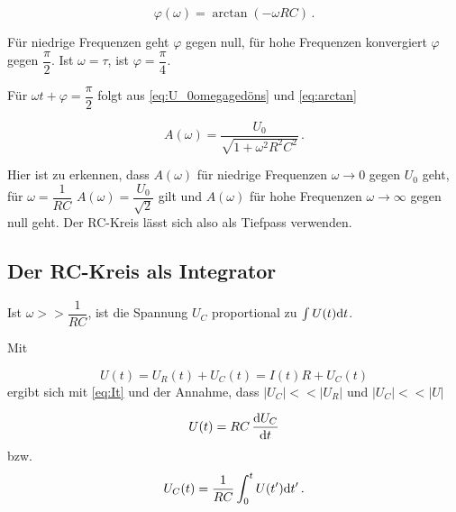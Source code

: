 \begin{equation}
    \varphi (ω) = \arctan(-ω R C) \,.
    \label{eq:arctan}
\end{equation}

Für niedrige Frequenzen geht $\varphi$ gegen null, für hohe Frequenzen konvergiert $\varphi$ gegen $\dfrac{\pi}{2}$.
Ist $\omega = \tau$, ist $\varphi = \dfrac{\pi}{4}$.

Für $\omega t + \varphi  = \dfrac{\pi}{2}$ folgt aus \eqref{eq:U_0omegagedöns} und \eqref{eq:arctan}

\begin{equation}
    A(\omega) = \frac{U_0}{\sqrt{1 + \omega^2 R^2 C^2}} \,.
\end{equation}

Hier ist zu erkennen, dass $A(\omega)$ für niedrige Frequenzen $\omega \rightarrow 0$ gegen $U_0$ geht, für $\omega = \dfrac{1}{RC}$ $A(\omega) = \dfrac{U_0}{\sqrt{2}}$ gilt und $A(\omega)$ für hohe Frequenzen $\omega \rightarrow \infty$ gegen null geht.
Der RC-Kreis lässt sich also als Tiefpass verwenden.

\subsection{Der RC-Kreis als Integrator}

Ist $\omega >> \dfrac{1}{RC}$, ist die Spannung $U_C$ proportional zu $\int U(t) \mathrm{d} t$.

Mit 

\begin{equation*}
    U(t) = U_R(t) + U_C(t) = I(t) R + U_C(t)
\end{equation*} ergibt sich mit \eqref{eq:It} und der Annahme, dass $|U_C| << |U_R|$ und $|U_C| << |U|$ 

\begin{equation}
    U(t) = RC \,\frac{\mathrm{d} U_C}{\mathrm{d} t}
\end{equation}
bzw.
\begin{equation}
    U_C(t) = \frac{1}{RC} \int_0^t U(t') \mathrm{d} t' \,.
    \label{eq:intkondspann}
\end{equation}
